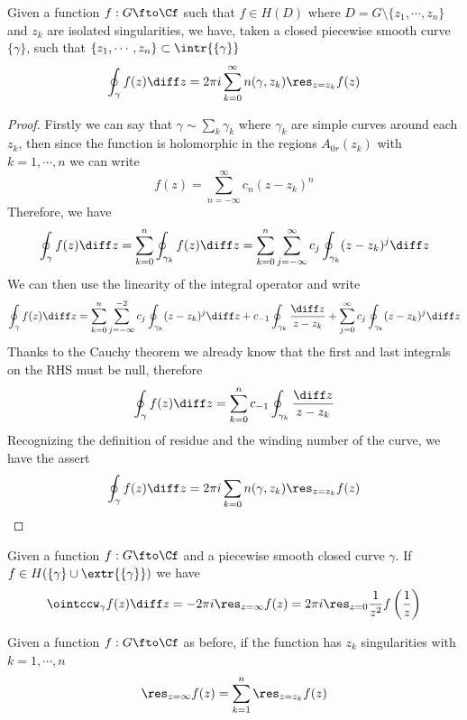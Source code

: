 \documentclass[../mmf.tex]{subfiles}
\begin{document}
\begin{thm}
	Given a function $f:G\fto\Cf$ such that $f\in H(D)$ where $D=G\setminus\{z_1,\cdots,z_n\}$ and $z_k$ are isolated singularities, we have, taken a closed piecewise smooth curve $\{\gamma\}$, such that $\{z_1,\cdots,z_n\}\subset\intr{\{\gamma\}}$
	\begin{equation}
		\oint_\gamma f(z)\diff z=2\pi i\sum_{k=0}^{\infty}n(\gamma,z_k)\res_{z=z_k}f(z)
		\label{eq:residuetheorem}
	\end{equation}
\end{thm}
\begin{proof}
	Firstly we can say that $\gamma\sim\sum_k\gamma_k$ where $\gamma_k$ are simple curves around each $z_k$, then since the function is holomorphic in the regions $A_{0r}(z_k)$ with $k=1,\cdots,n$ we can write
	\begin{equation*}
		f(z)=\sum_{n=-\infty}^{\infty}c_n(z-z_k)^n
	\end{equation*}
	Therefore, we have
	\begin{equation*}
		\oint_\gamma f(z)\diff z=\sum_{k=0}^{n}\oint_{\gamma_k}f(z)\diff z=\sum_{k=0}^n\sum_{j=-\infty}^\infty c_j\oint_{\gamma_k}(z-z_k)^j\diff z
	\end{equation*}
	We can then use the linearity of the integral operator and write
	\begin{equation*}
		\oint_\gamma f(z)\diff z=\sum_{k=0}^n\sum_{j=-\infty}^{-2}c_{j}\oint_{\gamma_k}(z-z_k)^j\diff z+c_{-1}\oint_{\gamma_k}\frac{\diff z}{z-z_k}+\sum_{j=0}^\infty c_j\oint_{\gamma_k}(z-z_k)^j\diff z
	\end{equation*}
	Thanks to the Cauchy theorem we already know that the first and last integrals on the RHS must be null, therefore
	\begin{equation*}
		\oint_\gamma f(z)\diff z=\sum_{k=0}^nc_{-1}\oint_{\gamma_k}\frac{\diff z}{z-z_k}
	\end{equation*}
	Recognizing the definition of residue and the winding number of the curve, we have the assert
	\begin{equation*}
		\oint_\gamma f(z)\diff z=2\pi i\sum_{k=0}n(\gamma,z_k)\res_{z=z_k}f(z)
	\end{equation*}
\end{proof}
\begin{dfn}
	Given a function $f:G\fto\Cf$ and a piecewise smooth closed curve $\gamma$. If $f\in H(\{\gamma\}\cup\extr{\{\gamma\}})$ we have
	\begin{equation}
		\ointccw_\gamma f(z)\diff z=-2\pi i\res_{z=\infty}f(z)=2\pi i\res_{z=0}\frac{1}{z^2}f\left( \frac{1}{z} \right)
		\label{eq:infresidue}
	\end{equation}
\end{dfn}
\begin{thm}
	Given a function $f:G\fto\Cf$ as before, if the function has $z_k$ singularities with $k=1,\cdots,n$
	\begin{equation}
		\res_{z=\infty}f(z)=\sum_{k=1}^n\res_{z=z_k}f(z)
		\label{eq:residueformula}
	\end{equation}
\end{thm}
\end{document}
